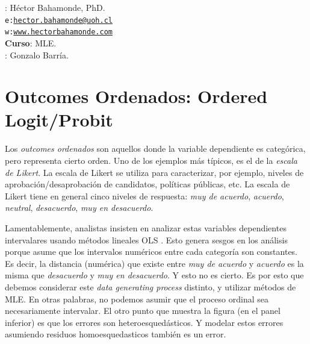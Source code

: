 \documentclass[onesided]{article}\usepackage[]{graphicx}\usepackage[]{color}
\begin{document}











\hspace{-5mm}{\bf Profesor}: H\'ector Bahamonde, PhD.\\
\texttt{e:}\href{mailto:hector.bahamonde@uoh.cl}{\texttt{hector.bahamonde@uoh.cl}}\\
\texttt{w:}\href{http://www.hectorbahamonde.com}{\texttt{www.hectorbahamonde.com}}\\
{\bf Curso}: MLE.\\
\hspace{-5mm}{\bf TA}: Gonzalo Barr\'ia.

\section{Outcomes Ordenados: Ordered Logit/Probit}


Los \emph{outcomes ordenados} son aquellos donde la variable dependiente es categ\'orica, pero representa cierto orden. Uno de los ejemplos m\'as t\'ipicos, es el de la \emph{escala de Likert}. La escala de Likert se utiliza para caracterizar, por ejemplo, niveles de aprobaci\'on/desaprobaci\'on de candidatos, pol\'iticas p\'ublicas, etc. La escala de Likert tiene en general cinco niveles de respuesta: \emph{muy de acuerdo}, \emph{acuerdo}, \emph{neutral}, \emph{desacuerdo}, \emph{muy en desacuerdo}. 

Lamentablemente, analistas insisten en analizar estas variables dependientes intervalares usando m\'etodos lineales OLS \parencite[115]{Long:1997wv}. Esto genera sesgos en los an\'alisis porque asume que los intervalos num\'ericos entre cada categor\'ia son constantes. Es decir, la distancia (num\'erica) que existe entre  \emph{muy de acuerdo} y \emph{acuerdo} es la misma que \emph{desacuerdo} y \emph{muy en desacuerdo}. Y esto no es cierto. Es por esto que debemos considerar este \emph{data generating process} distinto, y utilizar m\'etodos de MLE. En otras palabras, no podemos asumir que el proceso ordinal sea necesariamente intervalar. El otro punto que muestra la figura (en el panel inferior) es que los errores son heteroesqued\'asticos. Y modelar estos errores asumiendo residuos homoesquedasticos tambi\'en es un error.
\end{document}
